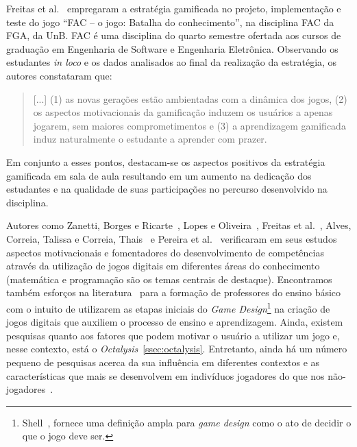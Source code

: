 Freitas et al.~\cite{freitas_gamificacao_2016} empregaram a estratégia gamificada no projeto, implementação e teste do jogo “FAC – o jogo: Batalha do conhecimento”, na disciplina \acrfull{FAC} da \acrfull{FGA}, da \acrfull{UnB}. \acrshort{FAC} é uma disciplina do quarto semestre ofertada aos cursos de graduação em Engenharia de Software e Engenharia Eletrônica. Observando os estudantes \textit{in loco} e os dados analisados ao final da realização da estratégia, os autores constataram que:

\begin{quote}
[...] (1) as novas gerações estão ambientadas com a dinâmica dos jogos, (2) os aspectos motivacionais da gamificação induzem os usuários a apenas jogarem, sem maiores comprometimentos e (3) a aprendizagem gamificada induz naturalmente o estudante a aprender com prazer.~\cite[~p.378]{freitas_gamificacao_2016}
\end{quote}

Em conjunto a esses pontos, destacam-se os aspectos positivos da estratégia gamificada em sala de aula resultando em um aumento na dedicação dos estudantes e na qualidade de suas participações no percurso desenvolvido na disciplina.

Autores como Zanetti, Borges e Ricarte~\cite{zanetti_pensamento_2016}, Lopes e Oliveira~\cite{lopes_videojogos_2013}, Freitas et al.~\cite{freitas_gamificacao_2016},  Alves, Correia, Talissa e Correia, Thais~\cite{correia_revisao_2016} e Pereira et al.~\cite{pereira_jogos_2016} verificaram em seus estudos aspectos motivacionais e fomentadores do desenvolvimento de competências através da utilização de jogos digitais em diferentes áreas do conhecimento (matemática e programação são os temas centrais de destaque). Encontramos também esforços na literatura~\cite{araujo_construcao_2016} para a formação de professores do ensino básico com o intuito de utilizarem as etapas iniciais do \textit{Game Design}\footnote{Shell~\cite{schell_art_2014}, fornece uma definição ampla para \textit{game design} como o ato de decidir o que o jogo deve ser.} na criação de jogos digitais que auxiliem o processo de ensino e aprendizagem. Ainda, existem pesquisas quanto aos fatores que podem motivar o usuário a utilizar um jogo e, nesse contexto, está o \textit{Octalysis}~\ref{ssec:octalysis}. Entretanto, ainda há um número pequeno de pesquisas acerca da sua influência em diferentes contextos e as características que mais se desenvolvem em indivíduos jogadores do que nos não-jogadores~\cite{correia_revisao_2016}.

